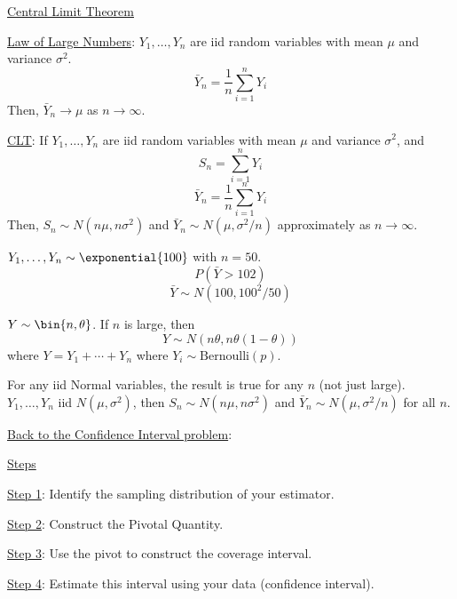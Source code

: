 \underline{Central Limit Theorem}

\underline{Law of Large Numbers}: $ Y_1,\ldots ,Y_n $ are iid random
variables with mean $ \mu $ and variance $ \sigma^2 $.
\[ \bar{Y}_n=\frac{1}{n} \sum\limits_{i=1}^{n} Y_i \]
Then, $ \bar{Y}_n\to \mu $ as $ n\to \infty $.

\underline{CLT}: If $ Y_1,\ldots ,Y_n $ are iid random variables
with mean $ \mu $ and variance $ \sigma^2 $, and
\[ S_n=\sum\limits_{i=1}^{n} Y_i \]
\[ \bar{Y}_n=\frac{1}{n} \sum\limits_{i=1}^{n} Y_i \]
Then, $ S_n \sim N(n\mu,n\sigma^2) $ and $ \bar{Y}_n
    \sim N(\mu,\sigma^2/n) $ approximately as $ n\to \infty $.

\begin{Example}{}{}
    $ Y_1,\ldots ,Y_n \sim \exponential{100} $ with $ n=50 $.
    \[ P\left(\bar{Y}>102\right) \]
    \[ \bar{Y} \sim N(100,100^2/50) \]
\end{Example}


\begin{Example}{}{}
    $ Y \sim \bin{n,\theta} $. If $ n $ is large, then
    \[ Y \sim N(n\theta,n\theta(1-\theta)) \]
    where $ Y=Y_1+\cdots+Y_n $ where $ Y_i \sim \text{Bernoulli}(p) $.
\end{Example}


\begin{Example}{}{}
    For any iid Normal variables, the result is true for any $ n $ (not just large).
    $ Y_1,\ldots ,Y_n $ iid $ N(\mu,\sigma^2) $, then $ S_n \sim N(n\mu,n\sigma^2) $
    and $ \bar{Y}_n \sim N(\mu,\sigma^2/n) $ for all $ n $.
\end{Example}

\underline{Back to the Confidence Interval problem}:

\underline{Steps}

\underline{Step 1}: Identify the sampling distribution of your estimator.

\underline{Step 2}: Construct the Pivotal Quantity.

\underline{Step 3}: Use the pivot to construct the coverage interval.

\underline{Step 4}: Estimate this interval using your data (confidence interval).


